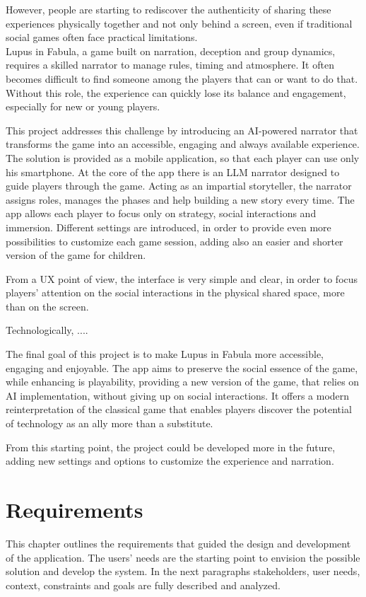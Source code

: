 \documentclass[12pt]{article}
\begin{document}
However, people are starting to rediscover the authenticity of sharing these experiences physically together and not only behind a screen, even if traditional social games often face practical limitations. \\Lupus in Fabula, a game built on narration, deception and group dynamics, requires a skilled narrator to manage rules, timing and atmosphere. It often becomes difficult to find someone among the players that can or want to do that. Without this role, the experience can quickly lose its balance and engagement, especially for new or young players. 

This project addresses this challenge by introducing an AI-powered narrator that transforms the game into an accessible, engaging and always available experience. \\The solution is provided as a mobile application, so that each player can use only his smartphone. At the core of the app there is an LLM narrator designed to guide players through the game. Acting as an impartial storyteller, the narrator assigns roles, manages the phases and help building a new story every time. The app allows each player to focus only on strategy, social interactions and immersion. Different settings are introduced, in order to provide even more possibilities to customize each game session, adding also an easier and shorter version of the game for children.

From a UX point of view, the interface is very simple and clear, in order to focus players' attention on the social interactions in the physical shared space, more than on the screen.

Technologically, ....

The final goal of this project is to make Lupus in Fabula more accessible, engaging and enjoyable. The app aims to preserve the social essence of the game, while enhancing is playability, providing a new version of the game, that relies on AI implementation, without giving up on social interactions. It offers a modern reinterpretation of the classical game that enables players discover the potential of technology as an ally more than a substitute.  

From this starting point, the project could be developed more in the future, adding new settings and options to customize the experience and narration. 


\newpage
\section{Requirements}
This chapter outlines the requirements that guided the design and development of the application. The users' needs are the starting point to envision the possible solution and develop the system. In the next paragraphs stakeholders, user needs, context, constraints and goals are fully described and analyzed.
\end{document}

